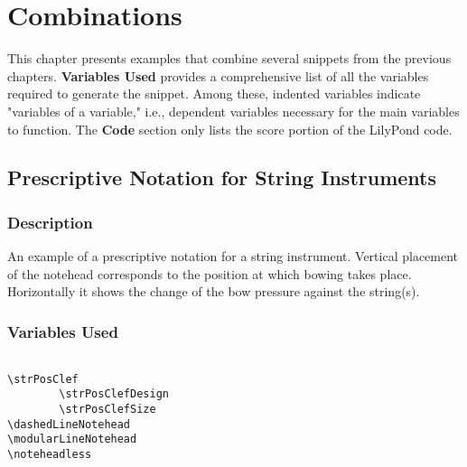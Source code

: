 
\chapter {Combinations}

This chapter presents examples that combine several snippets from the previous chapters. \textbf{Variables Used} provides a comprehensive list of all the variables required to generate the snippet. Among these, indented variables indicate "variables of a variable," i.e., dependent variables necessary for the main variables to function. The \textbf{Code} section only lists the score portion of the LilyPond code.

\section {Prescriptive Notation for String Instruments}
\label{sec:comb_strings}
\hfill
{}
\hfill

\subsection{Description}
An example of a prescriptive notation for a string instrument. Vertical placement of the notehead corresponds to the position at which bowing takes place. Horizontally it shows the change of the bow pressure against the string(s).
\subsection{Variables Used}
\begin{verbatim}

\strPosClef
		\strPosClefDesign
		\strPosClefSize
\dashedLineNotehead
\modularLineNotehead
\noteheadless
\end{verbatim}
